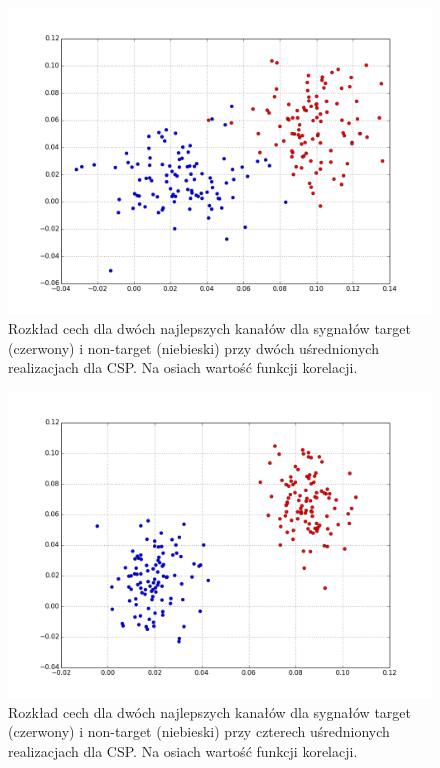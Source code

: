 \documentclass[licencjacka,openright]{pracamgr}
\begin{document}
\begin{figure}
\centering
\includegraphics[scale=0.55, trim=10mm 15mm 10mm 18mm, clip=True]{pics/cecha_csp_2.png}
\caption{Rozkład cech dla dwóch najlepszych kanałów dla sygnałów target (czerwony) i non-target (niebieski) przy dwóch uśrednionych realizacjach dla CSP. Na osiach wartość funkcji korelacji.}
\label{cecha_csp_2}
\end{figure}

\begin{figure}
\centering
\includegraphics[scale=0.55, trim=10mm 15mm 10mm 18mm, clip=True]{pics/cecha_csp_4.png}
\caption{Rozkład cech dla dwóch najlepszych kanałów dla sygnałów target (czerwony) i non-target (niebieski) przy czterech uśrednionych realizacjach dla CSP. Na osiach wartość funkcji korelacji.}
\label{cecha_csp_4}
\end{figure}
\end{document}
